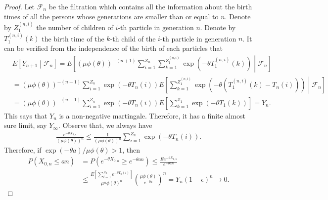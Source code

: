 \documentclass[12pt,a4paper]{amsart}
\theoremstyle{plain}
\theoremstyle{definition}
\theoremstyle{remark}
\numberwithin{equation}{section}
\begin{document}
\begin{proof}
Let $\mathcal F_n$ be the filtration which contains all the information about the birth times of all the persons whose generations are smaller than or equal to $n$.
Denote by $Z_1^{(n,i)}$ the number of children of $i$-th particle in generation $n$. 
Denote by $T_1^{(n,i)}(k)$ the birth time of the $k$-th child of the $i$-th particle in generation $n$.
It can be verified from the independence of the birth of each particles that
\begin{align}
  &E\left[ Y_{n+1}\middle|  \mathcal F_n  \right]
  = E \left[\left(\mu \phi(\theta)\right)^{-(n+1)} \sum_{i=1}^{Z_n} \sum_{k=1}^{Z_1^{(n,i)}} \exp(-\theta T_1^{(n,i)}(k)) \middle| \mathcal F_n \right]
  \\&= \left(\mu \phi(\theta)\right)^{-(n+1)} \sum_{i=1}^{Z_n} \exp(-\theta T_n(i)) E \left[ \sum_{k=1}^{Z_1^{(n,i)}} \exp\left(-\theta\left( T_1^{(n,i)}(k) - T_n(i)\right)\right) \middle| \mathcal F_n \right]
  \\&= \left(\mu \phi(\theta)\right)^{-(n+1)} \sum_{i=1}^{Z_n} \exp(-\theta T_n(i)) E \left[ \sum_{k=1}^{Z_1} \exp\left(-\theta T_1(k)\right) \right]
= Y_n.
\end{align}
This says that $Y_n$ is a non-negative martingale.
Therefore, it has a finite almost sure limit, say $Y_\infty$.
Observe that, we always have
\begin{align}
  \frac{e^{-\theta X_{0,n}}}{\left( \mu \phi(\theta) \right)^n} \leq \frac{1}{\left( \mu \phi(\theta) \right)^n} \sum_{i=1}^{Z_n} \exp\left( -\theta T_n(i) \right).
\end{align}
Therefore, if $\exp(-\theta a)/\mu \phi(\theta) > 1$, then
\begin{align}
P(X_{0,n} \leq an)
&= P(e^{-\theta X_{0,n}} \geq e^{-\theta a n}) 
\leq \frac{E e^{-\theta X_{0,n}}}{e^{-\theta a n}}
\\&\leq \frac{E[ \sum_{i=1}^{Z_n} e^{-\theta T_{n}(i)}]}{\mu^n \phi(\theta)^n} \left(\frac{\mu \phi(\theta)}{e^{-\theta a}}\right)^n
= Y_n (1-\epsilon)^n \to 0.
\end{align}
\end{proof}
\end{document}
